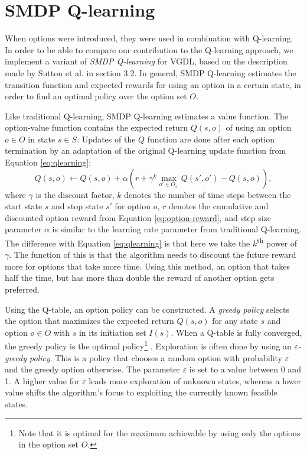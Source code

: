 \section{SMDP Q-learning}
\label{sec:qlearning}

When options were introduced, they were used in combination with Q-learning. In
order to be able to compare our contribution to the Q-learning approach, we
implement a variant of \emph{SMDP Q-learning} \cite{sutton1999between} for VGDL,
based on the description made by Sutton et al. in section 3.2. In general, SMDP
Q-learning estimates the transition function and expected rewards for using an
option in a certain state, in order to find an optimal policy over the option
set $O$.

Like traditional Q-learning, SMDP Q-learning estimates a value function. The
option-value function contains the expected return $Q(s, o)$ of using an option
$o \in O$ in state $s \in S$. Updates of the $Q$ function are done after each
option termination by an adaptation of the original Q-learning update function
from Equation \ref{eq:qlearning}:
\begin{equation}
	\label{eq:smdp-qlearning}
	Q(s, o) \gets Q(s, o) + \alpha \left(r + \gamma^k \max_{o' \in O_{s'}}Q(s',
	o') - Q(s, o)\right),
\end{equation}
where $\gamma$ is the discount factor, $k$ denotes the number of time steps
between the start state $s$ and stop state $s'$ for option $o$, $r$ denotes
the cumulative and discounted option reward from Equation
\ref{eq:option-reward}, and step size parameter $\alpha$ is similar to the
learning rate parameter from traditional Q-learning.  The difference with
Equation \ref{eq:qlearning} is that here we take the $k$\textsuperscript{th}
power of $\gamma$. The function of this is that the algorithm needs to discount
the future reward more for options that take more time. Using this method, an
option that takes half the time, but has more than double the reward of another
option gets preferred.

Using the Q-table, an option policy can be constructed. A \emph{greedy policy}
selects the option that maximizes the expected return $Q(s, o)$ for any state
$s$ and option $o \in O$ with $s$ in its initiation set $I(s)$. When a Q-table
is fully converged, the greedy policy is the optimal policy\footnote{Note that
it is optimal for the maximum achievable by using only the options in the option
set $O$.} \cite{sutton1999between}. Exploration is often done by using an
\emph{$\varepsilon$-greedy policy}. This is a policy that chooses a random option
with probability $\varepsilon$ and the greedy option otherwise. The parameter
$\varepsilon$ is set to a value between 0 and 1. A higher value for $\varepsilon$
leads more exploration of unknown states, whereas a lower value shifts the
algorithm's focus to exploiting the currently known feasible states.


